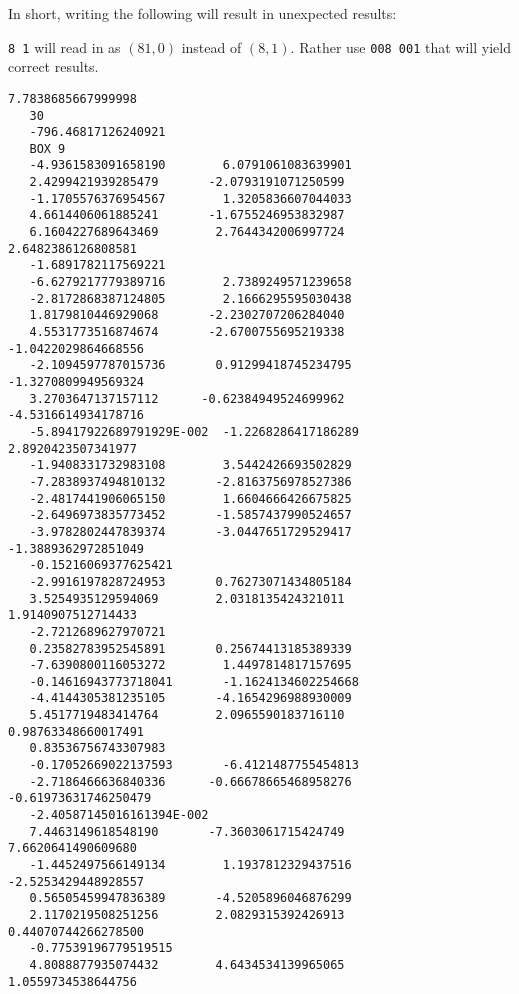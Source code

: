 In short, writing the following will result in unexpected results:

\verb|8 1| will read in as $(81, 0)$ instead of $(8, 1)$. Rather use 
\verb|008 001| that will yield correct results.

\begin{lstlisting}[caption=Example of a correct box-file]
   7.7838685667999998     
   30
   -796.46817126240921     
   BOX 9
   -4.9361583091658190        6.0791061083639901        
   2.4299421939285479       -2.0793191071250599       
   -1.1705576376954567        1.3205836607044033     
   4.6614406061885241       -1.6755246953832987        
   6.1604227689643469        2.7644342006997724        2.6482386126808581       
   -1.6891782117569221     
   -6.6279217779389716        2.7389249571239658       
   -2.8172868387124805        2.1666295595030438        
   1.8179810446929068       -2.2302707206284040     
   4.5531773516874674       -2.6700755695219338       -1.0422029864668556       
   -2.1094597787015736       0.91299418745234795       -1.3270809949569324     
   3.2703647137157112      -0.62384949524699962       -4.5316614934178716      
   -5.89417922689791929E-002  -1.2268286417186289        2.8920423507341977     
   -1.9408331732983108        3.5442426693502829       
   -7.2838937494810132       -2.8163756978527386       
   -2.4817441906065150        1.6604666426675825     
   -2.6496973835773452       -1.5857437990524657       
   -3.9782802447839374       -3.0447651729529417       -1.3889362972851049      
   -0.15216069377625421     
   -2.9916197828724953       0.76273071434805184        
   3.5254935129594069        2.0318135424321011        1.9140907512714433       
   -2.7212689627970721     
   0.23582783952545891       0.25674413185389339       
   -7.6390800116053272        1.4497814817157695      
   -0.14616943773718041       -1.1624134602254668     
   -4.4144305381235105       -4.1654296988930009        
   5.4517719483414764        2.0965590183716110       0.98763348660017491       
   0.83536756743307983     
   -0.17052669022137593       -6.4121487755454813       
   -2.7186466636840336      -0.66678665468958276      -0.61973631746250479      
   -2.40587145016161394E-002
   7.4463149618548190       -7.3603061715424749        7.6620641490609680       
   -1.4452497566149134        1.1937812329437516       -2.5253429448928557     
   0.56505459947836389       -4.5205896046876299        
   2.1170219508251256        2.0829315392426913       0.44070744266278500      
   -0.77539196779519515     
   4.8088877935074432        4.6434534139965065        1.0559734538644756       

\end{lstlisting}
